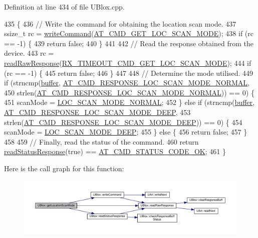 Definition at line 434 of file U\+Blox.\+cpp.


\begin{DoxyCode}
435 \{
436     \textcolor{comment}{// Write the command for obtaining the location scan mode.}
437     ssize\_t rc = \hyperlink{class_u_blox_af604d1897a66192bf1c2a11997f2634d}{writeCommand}(\hyperlink{_u_blox_8cpp_aa504e436aeb04e6bfb7c361cf9edbd84}{AT\_CMD\_GET\_LOC\_SCAN\_MODE});
438     \textcolor{keywordflow}{if} (rc == -1) \{
439         \textcolor{keywordflow}{return} \textcolor{keyword}{false};
440     \}
441 
442     \textcolor{comment}{// Read the response obtained from the device.}
443     rc = \hyperlink{class_u_blox_ab4a7ab4b8922d91e23f273ae160c1bed}{readRawResponse}(\hyperlink{_u_blox_8cpp_a0b1a22aab74a699289cd3d58b177fd21}{RX\_TIMEOUT\_CMD\_GET\_LOC\_SCAN\_MODE});
444     \textcolor{keywordflow}{if} (rc == -1) \{
445         \textcolor{keywordflow}{return} \textcolor{keyword}{false};
446     \}
447 
448     \textcolor{comment}{// Determine the mode utilised.}
449     \textcolor{keywordflow}{if} (strncmp(\hyperlink{class_u_blox_a6ca4b90f3dc4e856181dce1ebda6f82c}{buffer}, \hyperlink{_u_blox_8cpp_a2e9e8dc94d8cbe1833df3d521e4b08e9}{AT\_CMD\_RESPONSE\_LOC\_SCAN\_MODE\_NORMAL},
450                 strlen(\hyperlink{_u_blox_8cpp_a2e9e8dc94d8cbe1833df3d521e4b08e9}{AT\_CMD\_RESPONSE\_LOC\_SCAN\_MODE\_NORMAL})) == 0) \{
451         scanMode = \hyperlink{_u_blox_8h_a57e74368f6c6813ceb64f972eba4a5f3}{LOC\_SCAN\_MODE\_NORMAL};
452     \} \textcolor{keywordflow}{else} \textcolor{keywordflow}{if} (strncmp(\hyperlink{class_u_blox_a6ca4b90f3dc4e856181dce1ebda6f82c}{buffer}, \hyperlink{_u_blox_8cpp_a5e536a389492c1923382728d0e6c6931}{AT\_CMD\_RESPONSE\_LOC\_SCAN\_MODE\_DEEP},
453                        strlen(\hyperlink{_u_blox_8cpp_a5e536a389492c1923382728d0e6c6931}{AT\_CMD\_RESPONSE\_LOC\_SCAN\_MODE\_DEEP})) == 0) 
      \{
454         scanMode = \hyperlink{_u_blox_8h_a5c819e4d40995d2854dc0e2cddd7ddef}{LOC\_SCAN\_MODE\_DEEP};
455     \} \textcolor{keywordflow}{else} \{
456         \textcolor{keywordflow}{return} \textcolor{keyword}{false};
457     \}
458 
459     \textcolor{comment}{// Finally, read the status of the command.}
460     \textcolor{keywordflow}{return} \hyperlink{class_u_blox_a4eaca5b1b1c4b5b6f6164b220dd43e0b}{readStatusResponse}(\textcolor{keyword}{true}) == \hyperlink{_u_blox_8cpp_a6ebc1682eb6b9964fccb4a61688ff307}{AT\_CMD\_STATUS\_CODE\_OK};
461 \}
\end{DoxyCode}
Here is the call graph for this function\+:
\nopagebreak
\begin{figure}[H]
\begin{center}
\leavevmode
\includegraphics[width=350pt]{da/df6/class_u_blox_a398db4cdc2d5356fb86b3cd1021bad1b_cgraph}
\end{center}
\end{figure}
